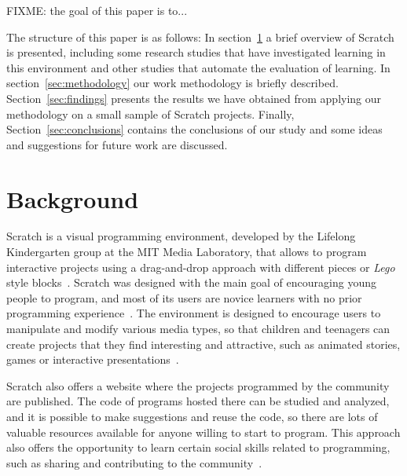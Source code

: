 \documentclass[conference]{format/IEEEtran}
\begin{document}
FIXME: the goal of this paper is to...

The structure of this paper is as follows: In section~\ref{sec:background} a brief overview of Scratch is presented, including some research studies that have investigated learning in this environment and other studies that automate the evaluation of learning. In section~\ref{sec:methodology} our work methodology is briefly described. Section~\ref{sec:findings} presents the results we have obtained from applying our methodology on a small sample of Scratch projects. Finally, Section~\ref{sec:conclusions} contains the conclusions of our study and some ideas and suggestions for future work are discussed.

\section{Background}
\label{sec:background}

Scratch is a visual programming environment, developed by the Lifelong Kindergarten group at the MIT Media Laboratory, that allows to program interactive projects using a drag-and-drop approach with different pieces or \textit {Lego} style blocks~\cite{resnick2009scratch}. Scratch was designed with the main goal of encouraging young people to program, and most of its users are novice learners with no prior programming experience~\cite{maloney2010scratch}. The environment is designed to encourage users to manipulate and modify various media types, so that children and teenagers can create projects that they find interesting and attractive, such as animated stories, games or interactive presentations~\cite{maloney2008programming}.

Scratch also offers a website where the projects programmed by the community are published. The code of programs hosted there can be studied and analyzed, and it is possible to make suggestions and reuse the code, so there are lots of valuable resources available for anyone willing to start to program. This approach also offers the opportunity to learn certain social skills related to programming, such as sharing and contributing to the community~\cite{scaffidi2012skill}.

\end{document}
